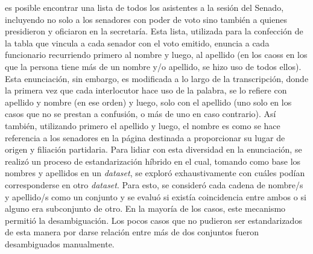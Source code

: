 es posible encontrar una lista de todos los asistentes a la sesión del Senado,
incluyendo no solo a los senadores con poder de voto sino también a quienes presidieron
y oficiaron en la secretaría. Esta lista, utilizada para la confección
de la tabla que vincula a cada senador con el voto emitido, enuncia a cada funcionario
recurriendo primero al nombre y luego, al apellido (en los caoss en los que
la persona tiene más de un nombre y/o apellido, se hizo uso de todos ellos). Esta
enunciación, sin embargo, es modificada a lo largo de la transcripción, donde la
primera vez que cada interlocutor hace uso de la palabra, se lo refiere con apellido
y nombre (en ese orden) y luego, solo con el apellido (uno solo en los casos que no
se prestan a confusión, o más de uno en caso contrario). Así también, utilizando primero
el apellido y luego, el nombre es como se hace referencia a los senadores en la página
destinada a proporcionar su lugar de origen y filiación partidaria. Para lidiar con esta
diversidad en la enunciación, se realizó un proceso de estandarización híbrido en el
cual, tomando como base los nombres y apellidos en un \textit{dataset}, se exploró
exhaustivamente con cuáles podían corresponderse en otro \textit{dataset}. Para esto, se
consideró cada cadena de nombre/s y apellido/s como un conjunto y se evaluó si existía
coincidencia entre ambos o si alguno era subconjunto de otro. En la mayoría de los casos,
este mecanismo permitió la desambiguación. Los pocos casos que no pudieron ser estandarizados
de esta manera por darse relación entre más de dos conjuntos fueron desambiguados manualmente.